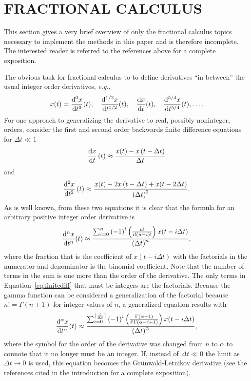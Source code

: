 \section{FRACTIONAL CALCULUS}
\label{sec:fractional}

  This section gives a very brief overview of only the fractional calculus
  topics necessary to implement the methods in this paper and is therefore
  incomplete. The interested reader is referred to the references above for a
  complete exposition.

  The obvious task for fractional calculus to to define derivatives ``in
  between'' the usual integer order derivatives, \textit{e.g.}, 
\[
x(t) = \frac{\mathrm{d}^0 x}{\mathrm{d} t^0}(t), \quad\frac{\mathrm{d}^{1/2} x}{\mathrm{d}
t^{1/2}}(t), \quad \frac{\mathrm{d} x}{\mathrm{d} t}(t),  \quad \frac{\mathrm{d}^{5/4} x}{\mathrm{d}
t^{5/4}}(t), \ldots.
\]
  For one approach to generalizing the derivative to real, possibly noninteger,
  orders, consider the first and second order backwards finite difference
  equations for $\Delta t \ll 1$
\[
 \frac{\mathrm{d} x}{\mathrm{d} t}\left(t\right) \approx \frac{x(t) - x \left(t - \Delta
 t\right)}{\Delta t}
 \]
 and
 \[
    \frac{\mathrm{d}^2 x}{\mathrm{d} t^2}\left(t\right) \approx \frac{x(t) - 2 x \left(t - \Delta
    t\right) + x(t - 2 \Delta t)}{\left( \Delta t \right)^2}.
 \]
 As is well known, from these two equations it is clear that the formula for an
 arbitrary positive integer order derivative is
 \begin{equation}
  \frac{\mathrm{d}^n x}{\mathrm{d} t^n}(t) \approx \frac{\sum_{i=0}^n \left( -1 \right)^i
  \left( \frac{n!}{i! \left( n - i \right)!} \right) x ( t - i \Delta t )}{\left( \Delta t
  \right)^n},
  \label{eq:finitediff}
 \end{equation}
 where the fraction that is the coefficient of $x(t - i \Delta t)$ with the
 factorials in the numerator and denominator is the binomial coefficient. Note
 that the number of terms in the sum is one more than the order of the
 derivative.  The only terms in Equation~\ref{eq:finitediff} that must be
 integers are the factorials. Because the gamma function can be considered a
 generalization of the factorial because $n! = \Gamma(n+1)$ for integer values
 of $n$, a generalized equation results with
 \begin{equation}
    \frac{\mathrm{d}^\alpha x}{\mathrm{d} t^\alpha}(t) \approx \frac{\sum_{i=0}^{\lceil
    \frac{t}{\Delta t} \rceil} \left( -1 \right)^i \left(
    \frac{\Gamma(\alpha+1)}{i! \Gamma\left( \alpha - i + 1\right)} \right) x ( t
    - i \Delta t )}{\left( \Delta t \right)^\alpha},
    \label{eq:gw}
 \end{equation}
 where the symbol for the order of the derivative was changed from $n$ to
 $\alpha$ to connote that it no longer must be an integer. 
 If, instead of $\Delta t \ll 0$ the limit as $\Delta t \rightarrow 0$ is used,
 this equation becomes the Gr\"unwald-Letnikov derivative (see the references
 cited in the introduction for a complete exposition). 
  
